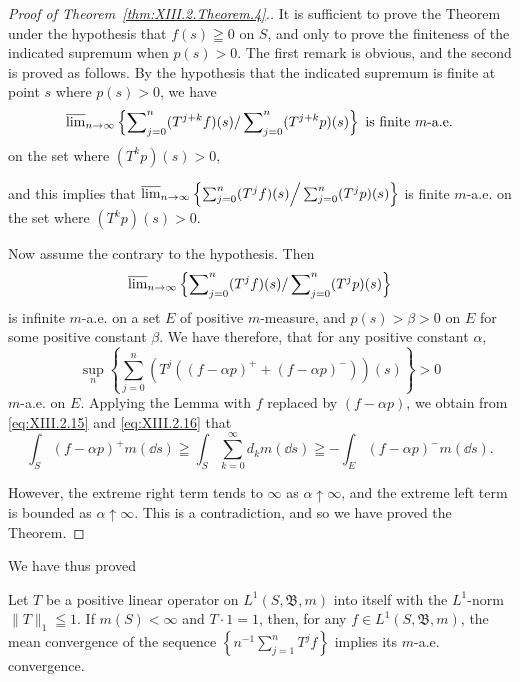 \begin{proof}[Proof of Theorem~\ref{thm:XIII.2.Theorem.4}.]
It is sufficient to prove the Theorem under the hypothesis that $f(s) \geqq 0$ on $S$, and only to prove the finiteness of the indicated supremum when $p(s) > 0$. The first remark is obvious, and the second is proved as follows. By the hypothesis that the indicated supremum is finite at point $s$ where $p(s) > 0$, we have
\begin{equation}\label{eq:XIII.2.26}
\varlimsup\limits_{n \rightarrow \infty} \left\{\sum\limits_{j=0} ^{n} (T ^{j+k} f) (s) / \sum\limits_{j=0} ^{n} (T ^{j+k} p) (s) \right\} \text{ is finite } m\text{-a.e.}
\end{equation}
on the set where $(T^k p)(s) > 0$, 


and this implies that $\varlimsup\limits_{n\to \infty}\left\{\sum\limits_{j=0}^{n}(T^j f)(s)\Big/\sum\limits_{j=0}^{n}(T^j p)(s)\right\}$ is finite $m$-a.e. on the set where $(T^k p)(s) > 0$. 

Now assume the contrary to the hypothesis. Then 
\[
\varlimsup\limits_{n \rightarrow \infty} \left\{\sum\limits_{j=0} ^{n} (T ^{j} f) (s) / \sum\limits_{j=0} ^{n} (T ^{j} p) (s) \right\}
\]
is infinite $m$-a.e. on a set $E$ of positive $m$-measure, and $p(s) > \beta > 0$ on $E$ for some positive constant $\beta$. We have therefore, that for any positive constant $\alpha$, 
\[
\sup\limits _{n} \left\{\sum\limits_{j=0} ^{n} \left(T ^{j} ((f - \alpha p) ^{+} + (f - \alpha p) ^{-})\right) (s) \right\} > 0
\]
$m$-a.e. on $E$. Applying the Lemma with $f$ replaced by $(f - \alpha p)$, we obtain from \eqref{eq:XIII.2.15} and \eqref{eq:XIII.2.16} that 
\[
\int_{S} (f - \alpha p) ^{+} m (\dd s) \geqq \int_{S} \sum\limits_{k=0} ^{\infty} d _{k} m (\dd s) \geqq - \int_{E} (f - \alpha p) ^{-} m (\dd s).
\]

However, the extreme right term tends to $\infty$ as $\alpha\uparrow\infty$, and the extreme left term is bounded as $\alpha\uparrow\infty$. This is a contradiction, and so we have proved the Theorem. 
\end{proof}

We have thus proved 


\begin{theorem}\label{thm:XIII.2.Theorem.5} Let $T$ be a positive linear operator on $L^1(S, \mathfrak{B}, m)$ into itself with the $L^1$-norm $\| T \|_1 \leqq 1$. If $m(S) < \infty$ and $T \cdot 1 = 1$, then, for any $f \in L^1(S, \mathfrak{B}, m)$, the mean convergence of the sequence $\left\{ n^{-1} \sum\limits_{j=1}^{n} T^j f \right\}$ implies its $m$-a.e. convergence. 
\end{theorem}

